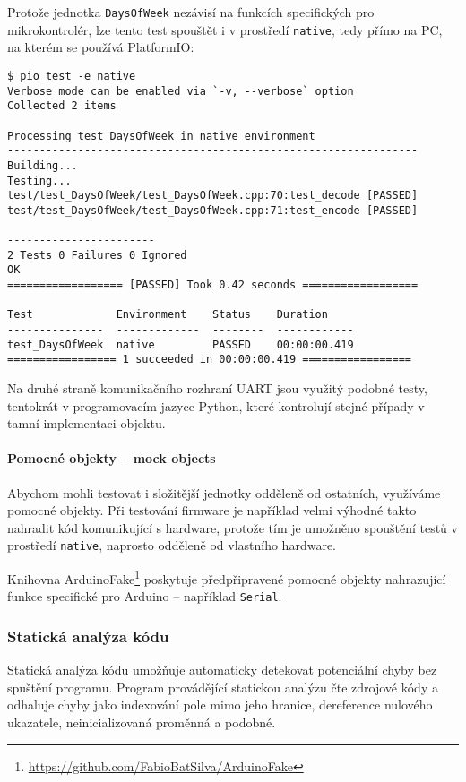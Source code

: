 Protože jednotka \texttt{DaysOfWeek} nezávisí na funkcích specifických pro
mikrokontrolér, lze tento test spouštět i v prostředí \texttt{native}, tedy
přímo na PC, na kterém se používá PlatformIO:
\begin{lstlisting}[style=terminal,columns=fixed]
$ pio test -e native
Verbose mode can be enabled via `-v, --verbose` option
Collected 2 items

Processing test_DaysOfWeek in native environment
----------------------------------------------------------------
Building...
Testing...
test/test_DaysOfWeek/test_DaysOfWeek.cpp:70:test_decode	[PASSED]
test/test_DaysOfWeek/test_DaysOfWeek.cpp:71:test_encode	[PASSED]

-----------------------
2 Tests 0 Failures 0 Ignored
OK
================== [PASSED] Took 0.42 seconds ==================

Test             Environment    Status    Duration
---------------  -------------  --------  ------------
test_DaysOfWeek  native         PASSED    00:00:00.419
================= 1 succeeded in 00:00:00.419 =================
\end{lstlisting}

Na druhé straně komunikačního rozhraní UART jsou využitý podobné testy,
tentokrát v programovacím jazyce Python, které kontrolují stejné případy
v tamní implementaci objektu.


\paragraph{Pomocné objekty -- mock objects}
Abychom mohli testovat i složitější jednotky odděleně od ostatních, využíváme
pomocné objekty. Při testování firmware je například velmi výhodné takto
nahradit kód komunikující s hardware, protože tím je umožněno spouštění testů
v prostředí \texttt{native}, naprosto odděleně od vlastního hardware.

Knihovna
ArduinoFake\footnote{\url{https://github.com/FabioBatSilva/ArduinoFake}}
poskytuje předpřipravené pomocné objekty nahrazující funkce specifické pro
Arduino -- například \texttt{Serial}.


\subsubsection{Statická analýza kódu}
Statická analýza kódu umožňuje automaticky detekovat potenciální chyby bez
spuštění programu. Program provádějící statickou analýzu čte zdrojové kódy
a odhaluje chyby jako indexování pole mimo jeho hranice, dereference nulového
ukazatele, neinicializovaná proměnná a podobné.

